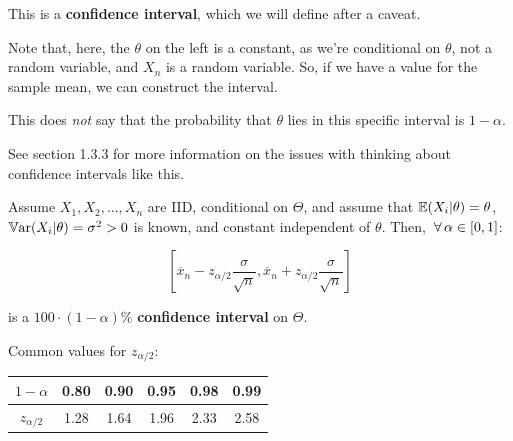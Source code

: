 \documentclass[a4paper]{article}
\begin{document}
                This is a \textbf{confidence interval}, which we will define
                after a caveat.

                \begin{warn}
                    Note that, here, the $\theta$ on the left is a constant, as
                    we're conditional on $\theta$, not a random variable, and
                    $X_n$ is a random variable. So, if we have a value for the
                    sample mean, we can construct the interval.

                    This does \textit{not} say that the probability that
                    $\theta$ lies in this specific interval is $1 - \alpha$.

                    See section 1.3.3 for more information on the issues with
                    thinking about confidence intervals like this.
                \end{warn}

                \begin{definition}
                    Assume $X_1, X_2, ..., X_n$ are IID, conditional on
                    $\Theta$, and assume that $\mathbb{E}(X_i | \theta) = \theta$,
                    $\mathbb{V}\text{ar}(X_i | \theta) = \sigma^2 > 0$ is known, and constant
                    independent of $\theta$. Then, $\,\forall\, \alpha \in [0, 1]$:

                    \[
                        \left[\overline x_n - z_{\alpha/2}\frac{\sigma}
                        {\sqrt{n}}, \overline x_n + z_{\alpha/2}
                        \frac{\sigma}{\sqrt{n}}\right]
                    \]

                    is a $100 \cdot (1 - \alpha)\%$ \textbf{confidence interval}
                    on $\Theta$.
                \end{definition}

                Common values for $z_{\alpha/2}$:

                \begin{center}
                    \begin{tabular}{c | c c c c c}
                        $1 - \alpha$ & 0.80 & 0.90 & 0.95 & 0.98 & 0.99 \\
                        \hline
                        $z_{\alpha/2}$ & 1.28 & 1.64 & 1.96 & 2.33 & 2.58
                    \end{tabular}
                \end{center}
\end{document}
